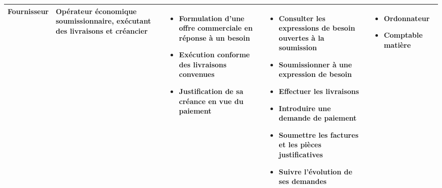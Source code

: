 \begin{landscape}
\begin{longtable}{L{2.8cm} L{3.6cm} L{5.8cm} L{6.2cm} L{3.8cm}}
\textbf{Fournisseur} &
Opérateur économique soumissionnaire, exécutant des livraisons et créancier &
\begin{itemize}[leftmargin=1em, nosep]
  \item Formulation d'une offre commerciale en réponse à un besoin
  \item Exécution conforme des livraisons convenues
  \item Justification de sa créance en vue du paiement
\end{itemize} &
\begin{itemize}[leftmargin=1em, nosep]
  \item Consulter les expressions de besoin ouvertes à la soumission
  \item Soumissionner à une expression de besoin
  \item Effectuer les livraisons
  \item Introduire une demande de paiement
  \item Soumettre les factures et les pièces justificatives
  \item Suivre l'évolution de ses demandes
\end{itemize} &
\begin{itemize}[leftmargin=1em, nosep]
  \item Ordonnateur
  \item Comptable matière
\end{itemize} \\
\midrule


\end{longtable}
\end{landscape}
